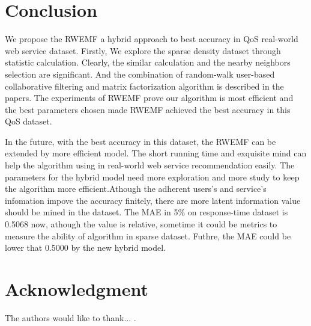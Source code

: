 \documentclass[conference]{IEEEtran}
\begin{document}
\section{Conclusion}\label{S-CN}
\par We propose the RWEMF a hybrid approach to best accuracy in QoS real-world web service dataset. Firstly, We explore the sparse density dataset through statistic calculation. Clearly, the similar calculation and the nearby neighbors selection are significant. And the combination of random-walk user-based collaborative filtering and matrix factorization algorithm is described in the papers. The experiments of RWEMF prove our algorithm is most efficient and the best parameters chosen made RWEMF achieved the best accuracy in this QoS dataset.
\par In the future, with the best accuracy in this dataset, the RWEMF can be extended by more efficient model. The short running time and exquisite mind can help the algorithm using in real-world web service recommendation easily. The parameters for the hybrid model need more exploration and more study to keep the algorithm more efficient.Athough the adherent users's and service's infomation impove the accuracy finitely, there are more latent information value should be mined in the dataset. The MAE in 5\% on response-time dataset is 0.5068 now, athough the value is relative, sometime it could be metrics to measure the ability of algorithm in sparse dataset. Futhre, the MAE could be lower that 0.5000 by the new hybrid model.

\section*{Acknowledgment}
The authors would like to thank...
\cite{lo_extended_2012}
\cite{lee_algorithms_2000}
\cite{chen_web_2014}
\cite{liu_location-aware_2016}
\cite{yin_network_2017}
\cite{zhang_exploring_2011}
\cite{li_kuang_personalized_2012}.




% 

\end{document}
